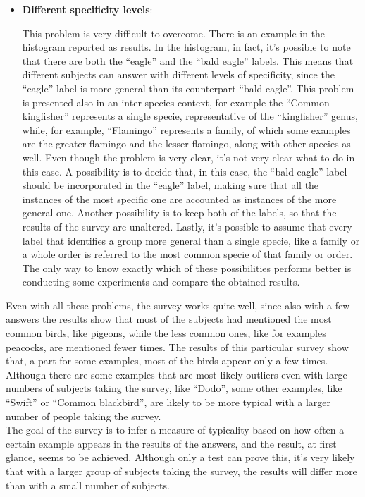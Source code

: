 \documentclass[conference]{IEEEtran}
\begin{document}
\begin{itemize}
			\item \textbf{Different specificity levels}:
			
				\noindent This problem is very difficult to overcome. There is an example in the histogram reported as results. In the histogram, in fact, it's possible to note that there are both the ``eagle'' and 
				the ``bald eagle'' labels. This means that different subjects can answer with different levels of specificity, since the ``eagle'' label is more general than its counterpart ``bald eagle''. 
				This problem is presented also in an inter-species context, for example the ``Common kingfisher'' represents a single specie, representative of the ``kingfisher'' genus, while, for example, 
				``Flamingo'' represents a family, of which some examples are the greater flamingo and the lesser flamingo, along with other species as well. 
				Even though the problem is very clear, it's not very clear what to do in this case. A possibility is to decide that, in this case, the ``bald eagle'' label should be incorporated in the ``eagle'' 
				label, making sure that all the instances of the most specific one are accounted as instances of the more general one. Another possibility is to keep both of the labels, so that the results of 
				the survey are unaltered. Lastly, it's possible to assume that every label that identifies a group more general than a single specie, like a family or a whole order is referred to the most 
				common specie of that family or order. The only way to know exactly which of these possibilities performs better is conducting some experiments and compare the obtained results.
		
		\end{itemize}
		
		\noindent Even with all these problems, the survey works quite well, since also with a few answers the results show that most of the subjects had mentioned the most common birds, like pigeons, while the 
		less common ones, like for examples peacocks, are mentioned fewer times. The results of this particular survey show that, a part for some examples, most of the birds appear only a few times. Although there 
		are some examples that are most likely outliers even with large numbers of subjects taking the survey, like ``Dodo'', some other examples, like ``Swift'' or ``Common blackbird'', 
		are likely to be more typical with a larger number of people taking the survey.\\
		The goal of the survey is to infer a measure of typicality based on how often a certain example appears in the results of the answers, and the result, at first glance, seems to be achieved. Although only 
		a test can prove this, it's very likely that with a larger group of subjects taking the survey, the results will differ more than with a small number of subjects. 
		
	\newpage
	
	\nocite{*}
	\printbibliography
\end{document}
